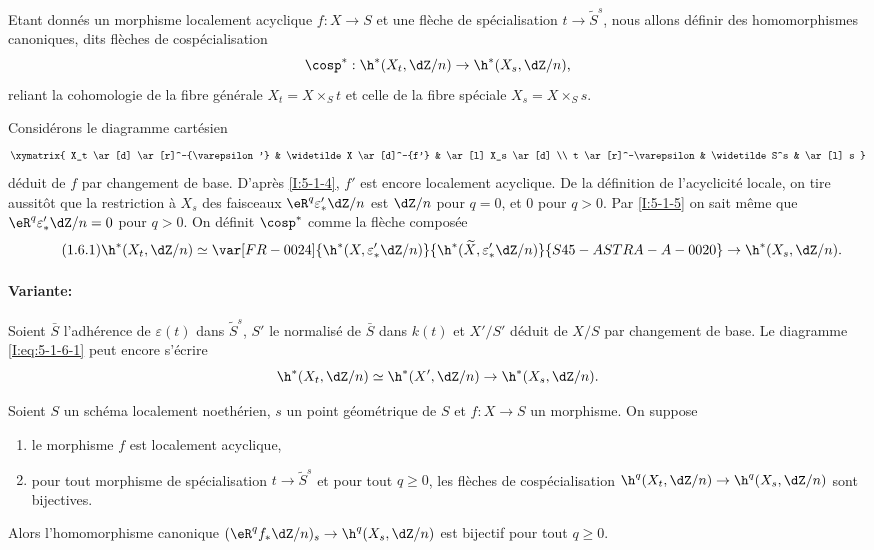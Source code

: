 \begin{sourceinline}\label{I:5-1-6}

Etant donnés un morphisme localement acyclique $f:X\to S$ et une flèche de 
spécialisation $t\to \widetilde S^s$, nous allons définir des 
homomorphismes canoniques, dits flèches de cospécialisation 
\[
  \cosp^* : \h^*(X_t,\dZ/n) \to \h^*(X_s,\dZ/n)\text{,}
\]
reliant la cohomologie de la fibre générale $X_t=X\times_S t$ et celle de la 
fibre spéciale $X_s=X\times_S s$. 
\end{sourceinline}
Considérons le diagramme cartésien 
\[\xymatrix{
  X_t \ar[d] \ar[r]^-{\varepsilon'} 
    & \widetilde X \ar[d]^-{f'} 
    & \ar[l] X_s \ar[d] \\
  t \ar[r]^-\varepsilon 
    & \widetilde S^s 
    & \ar[l] s
}\]
déduit de $f$ par changement de base. D'après \ref{I:5-1-4}, $f'$ est encore 
localement acyclique. De la définition de l'acyclicité locale, on tire 
aussitôt que la restriction à $X_s$ des faisceaux $\eR^q \varepsilon_*' \dZ/n$ 
est $\dZ/n$ pour $q=0$, et $0$ pour $q>0$. Par \ref{I:5-1-5} on sait même que 
$\eR^q \varepsilon_*'\dZ/n = 0$ pour $q>0$. On définit $\cosp^*$ comme la 
flèche composée 
\begingroup
\makeatletter
\tagsleft@true
\let\veqno\@@leqno
\makeatother
\begin{equation*}\tag{1.6.1}\label{I:eq:5-1-6-1}
  \h^*(X_t,\dZ/n) \simeq \var[FR-0024]{\h^*(X,\varepsilon_*' \dZ/n)}{\h^*(\widetilde X,\varepsilon_*' \dZ/n)}{S45-ASTRA-A-0020} \to \h^*(X_s,\dZ/n) \text{.}
\end{equation*}
\endgroup

\paragraph{Variante:}
Soient $\bar S$ l'adhérence de $\varepsilon(t)$ dans $\widetilde S^s$, $S'$ le 
normalisé de $\bar S$ dans $k(t)$ et $X'/S'$ déduit de $X/S$ par changement 
de base. Le diagramme \eqref{I:eq:5-1-6-1} peut encore s'écrire 
\[
  \h^*(X_t,\dZ/n) \simeq \h^*(X',\dZ/n) \to \h^*(X_s,\dZ/n) \text{.}
\]





\begin{theoremdotdash}\label{I:5-1-7}
Soient $S$ un schéma localement noethérien, $s$ un point géométrique de 
$S$ et $f:X\to S$ un morphisme. On suppose 
\begin{enumerate}[\indent a)]
  \item le morphisme $f$ est localement acyclique, 
  \item pour tout morphisme de spécialisation $t\to \widetilde S^s$ et pour 
    tout $q\geqslant 0$, les flèches de cospécialisation 
    $\h^q(X_t,\dZ/n) \to \h^q(X_s,\dZ/n)$ sont bijectives.
\end{enumerate}

Alors l'homomorphisme canonique $(\eR^q f_*\dZ/n)_s\to \h^q(X_s,\dZ/n)$ est 
bijectif pour tout $q\geqslant 0$. 
\end{theoremdotdash}

